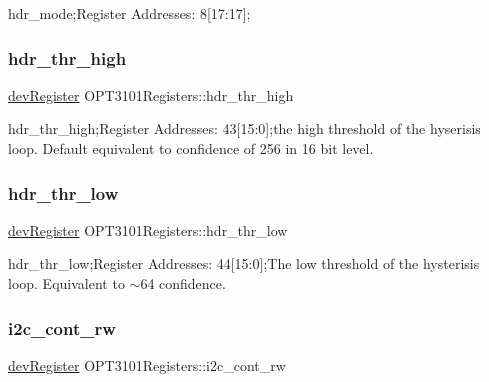 hdr\+\_\+mode;Register Addresses\+: 8\mbox{[}17\+:17\mbox{]}; 

\mbox{\label{class_o_p_t3101_registers_ab16a2263e007cef95441aac08fd8e4dd}} 
\subsubsection{\texorpdfstring{hdr\+\_\+thr\+\_\+high}{hdr\_thr\_high}}
{\footnotesize\ttfamily \mbox{\hyperlink{classdev_register}{dev\+Register}} O\+P\+T3101\+Registers\+::hdr\+\_\+thr\+\_\+high}



hdr\+\_\+thr\+\_\+high;Register Addresses\+: 43\mbox{[}15\+:0\mbox{]};the high threshold of the hyserisis loop. Default equivalent to confidence of 256 in 16 bit level. 

\mbox{\label{class_o_p_t3101_registers_acd6df660e813787d9d2ae99df5133166}} 
\subsubsection{\texorpdfstring{hdr\+\_\+thr\+\_\+low}{hdr\_thr\_low}}
{\footnotesize\ttfamily \mbox{\hyperlink{classdev_register}{dev\+Register}} O\+P\+T3101\+Registers\+::hdr\+\_\+thr\+\_\+low}



hdr\+\_\+thr\+\_\+low;Register Addresses\+: 44\mbox{[}15\+:0\mbox{]};The low threshold of the hysterisis loop. Equivalent to $\sim$64 confidence. 

\mbox{\label{class_o_p_t3101_registers_ae5bde1d46ee3c6d51052c09e1ad84f84}} 
\subsubsection{\texorpdfstring{i2c\+\_\+cont\+\_\+rw}{i2c\_cont\_rw}}
{\footnotesize\ttfamily \mbox{\hyperlink{classdev_register}{dev\+Register}} O\+P\+T3101\+Registers\+::i2c\+\_\+cont\+\_\+rw}



